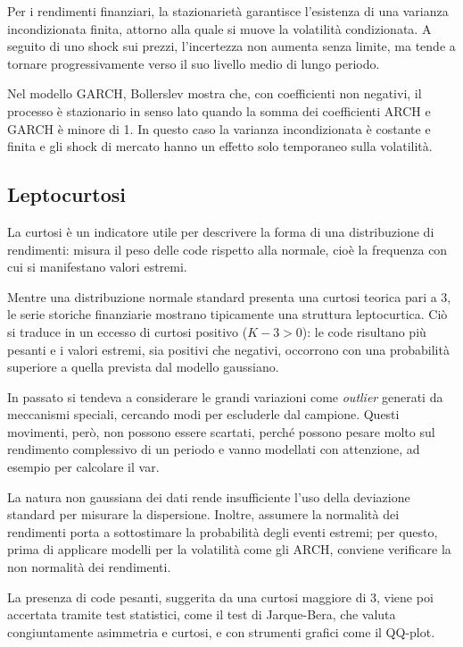 Per i rendimenti finanziari, la stazionarietà garantisce l'esistenza di una varianza incondizionata finita, attorno alla quale si muove la 
volatilità condizionata. A seguito di uno shock sui prezzi, l'incertezza non aumenta senza limite, ma tende a tornare progressivamente verso 
il suo livello medio di lungo periodo.

Nel modello GARCH, Bollerslev\cite{bollerslev:garch} mostra che, con coefficienti non negativi, il processo è stazionario 
in senso lato quando la somma dei coefficienti ARCH e GARCH è minore di 1. In questo caso la varianza incondizionata è costante e finita 
e gli shock di mercato hanno un effetto solo temporaneo sulla volatilità.


\subsection{Leptocurtosi}
La curtosi è un indicatore utile per descrivere la forma di una distribuzione di rendimenti: misura il peso delle code rispetto alla normale, 
cioè la frequenza con cui si manifestano valori estremi\cite{tsay:analysis}.

Mentre una distribuzione normale standard presenta una curtosi teorica pari a 3, le serie storiche finanziarie mostrano tipicamente una 
struttura leptocurtica. Ciò si traduce in un eccesso di curtosi positivo ($K - 3 > 0$): le code risultano più pesanti e i valori estremi, 
sia positivi che negativi, occorrono con una probabilità superiore a quella prevista dal modello gaussiano\cite{cont:empirical}.

In passato si tendeva a considerare le grandi variazioni come \emph{outlier} generati da meccanismi speciali, cercando modi per escluderle 
dal campione\cite{fama:behavior}.
Questi movimenti, però, non possono essere scartati, perché possono pesare molto sul rendimento complessivo di un periodo e vanno 
modellati con attenzione, ad esempio per calcolare il \gls{var}\cite{cont:empirical}.

La natura non gaussiana dei dati rende insufficiente l'uso della deviazione standard per misurare la dispersione\cite{cont:empirical}. 
Inoltre, assumere la normalità dei rendimenti porta a sottostimare la probabilità degli eventi estremi; per questo, prima di applicare 
modelli per la volatilità come gli ARCH\cite{engle:arch}, conviene verificare la non normalità dei rendimenti.

La presenza di code pesanti, suggerita da una curtosi maggiore di 3, viene poi accertata tramite test statistici, come il test di Jarque-Bera, 
che valuta congiuntamente asimmetria e curtosi\cite{jarque:bera}, e con strumenti grafici come il QQ-plot.

